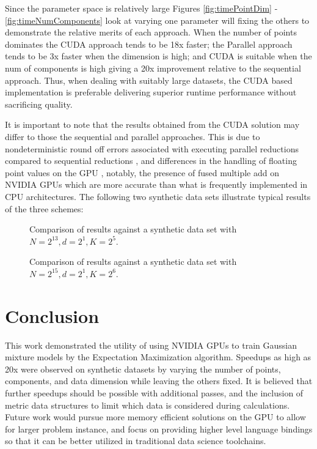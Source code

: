 \documentclass{article}
\begin{document}
Since the parameter space is relatively large Figures \ref{fig:timePointDim} - \ref{fig:timeNumComponents} look at varying one parameter will fixing the others to demonstrate the relative merits of each approach. When the number of points dominates the CUDA approach tends to be 18x faster; the Parallel approach tends to be 3x faster when the dimension is high; and CUDA is suitable when the num of components is high giving a 20x improvement relative to the sequential approach. Thus, when dealing with suitably large datasets, the CUDA based implementation is preferable delivering superior runtime performance without sacrificing quality.

It is important to note that the results obtained from the CUDA solution may differ to those the sequential and parallel approaches. This is due to nondeterministic round off errors associated with executing parallel reductions compared to sequential reductions \cite{collange2015numerical}, and differences in the handling of floating point values on the GPU \cite{whitehead2011precision}, notably, the presence of fused multiple add on NVIDIA GPUs which are more accurate than what is frequently implemented in CPU architectures. The following two synthetic data sets illustrate typical results of the three schemes:

\begin{figure}[H]
	\caption{Comparison of results against a synthetic data set with $N = 2^{13}, d = 2^{1}, K = 2^{5}$.}
\end{figure}

\begin{figure}[H]
	\caption{Comparison of results against a synthetic data set with $N = 2^{15}, d = 2^{1}, K = 2^{6}$.}
\end{figure}

\section{Conclusion}

This work demonstrated the utility of using NVIDIA GPUs to train Gaussian mixture models by the Expectation Maximization algorithm. Speedups as high as 20x were observed on synthetic datasets by varying the number of points, components, and data dimension while leaving the others fixed. It is believed that further speedups should be possible with additional passes, and the inclusion of metric data structures to limit which data is considered during calculations. Future work would pursue more memory efficient solutions on the GPU to allow for larger problem instance, and focus on providing higher level language bindings so that it can be better utilized in traditional data science toolchains.



\end{document}
